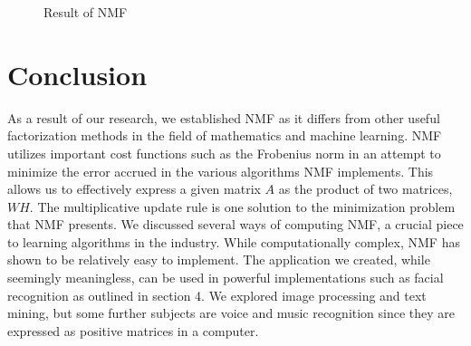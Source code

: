 \documentclass[
10pt, %
a4paper, %
oneside, %
headinclude,footinclude, %
BCOR5mm, %
]{scrartcl}
\begin{document}
\begin{figure}[tb]
    \centering
    \caption{Result of NMF}
    \label{fig:application}
\end{figure}
\newpage
\section{Conclusion}
As a result of our research, we established NMF as it differs from other useful factorization methods in the field of mathematics and machine learning. NMF utilizes important cost functions such as the Frobenius norm in an attempt to minimize the error accrued in the various algorithms NMF implements. This allows us to effectively express a given matrix $A$ as the product of two matrices, $WH$. The multiplicative update rule is one solution to the minimization problem that NMF presents. We discussed several ways of computing NMF, a crucial piece to learning algorithms in the industry. While computationally complex, NMF has shown to be relatively easy to implement. The application we created, while seemingly meaningless, can be used in powerful implementations such as facial recognition as outlined in section 4. We explored image processing and text mining, but some further subjects are voice and music recognition since they are expressed as positive matrices in a computer.
\newpage
\renewcommand{\refname}{\spacedlowsmallcaps{References}} %

\end{document}
